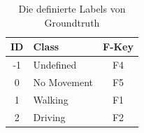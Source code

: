 \begin{table}[htpb]
	\caption{Die definierte Labels von Groundtruth}
	\label{tab:TabCalimotoLabelsID}
	\centering
		\begin{tabular}{|c|l|c|}
		\hline
		\textbf{ID} & \textbf{Class} & \textbf{F-Key} \\
		\hline
		-1 & Undefined & F4 \\ 
		\hline
		0 & No Movement & F5 \\ 
		\hline
		1 & Walking & F1 \\ 
		\hline
		2 & Driving & F2 \\ 
		\hline
	\end{tabular}
\end{table}


